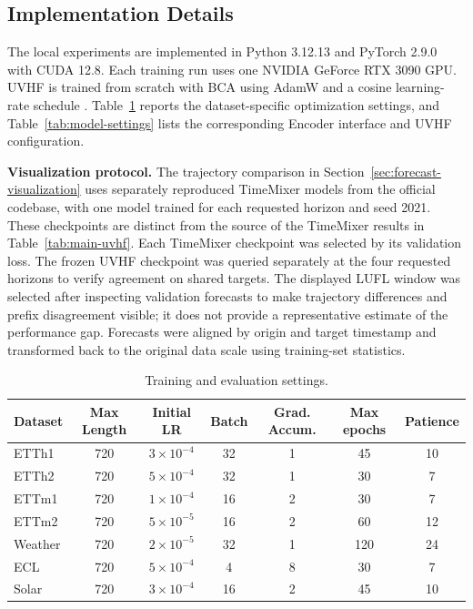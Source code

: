 \documentclass[final,3p,times]{elsarticle}
\begin{document}
\subsection{Implementation Details}


The local experiments are implemented in Python 3.12.13 and PyTorch 2.9.0 with CUDA 12.8. Each training run uses one NVIDIA GeForce RTX 3090 GPU. UVHF is trained from scratch with BCA using AdamW and a cosine learning-rate schedule \citep{loshchilov2019adamw,loshchilov2017sgdr}. Table~\ref{tab:training-settings} reports the dataset-specific optimization settings, and Table~\ref{tab:model-settings} lists the corresponding Encoder interface and UVHF configuration.

\textbf{Visualization protocol.} The trajectory comparison in Section~\ref{sec:forecast-visualization} uses separately reproduced TimeMixer models from the official codebase, with one model trained for each requested horizon and seed 2021. These checkpoints are distinct from the source of the TimeMixer results in Table~\ref{tab:main-uvhf}. Each TimeMixer checkpoint was selected by its validation loss. The frozen UVHF checkpoint was queried separately at the four requested horizons to verify agreement on shared targets. The displayed LUFL window was selected after inspecting validation forecasts to make trajectory differences and prefix disagreement visible; it does not provide a representative estimate of the performance gap. Forecasts were aligned by origin and target timestamp and transformed back to the original data scale using training-set statistics.

\begin{table}[t]
\centering
\caption{Training and evaluation settings.}
\label{tab:training-settings}
\scriptsize
\setlength{\tabcolsep}{4pt}
\begin{tabular}{lcccccc}
\toprule
Dataset & Max Length & Initial LR & Batch & Grad. Accum. & Max epochs & Patience \\
\midrule
ETTh1 & 720 & $3\times10^{-4}$ & 32 & 1 & 45 & 10 \\
ETTh2 & 720 & $5\times10^{-4}$ & 32 & 1 & 30 & 7 \\
ETTm1 & 720 & $1\times10^{-4}$ & 16 & 2 & 30 & 7 \\
ETTm2 & 720 & $5\times10^{-5}$ & 16 & 2 & 60 & 12 \\
Weather & 720 & $2\times10^{-5}$ & 32 & 1 & 120 & 24 \\
ECL & 720 & $5\times10^{-4}$ & 4 & 8 & 30 & 7 \\
Solar & 720 & $3\times10^{-4}$ & 16 & 2 & 45 & 10 \\
\bottomrule
\end{tabular}
\end{table}
\end{document}
